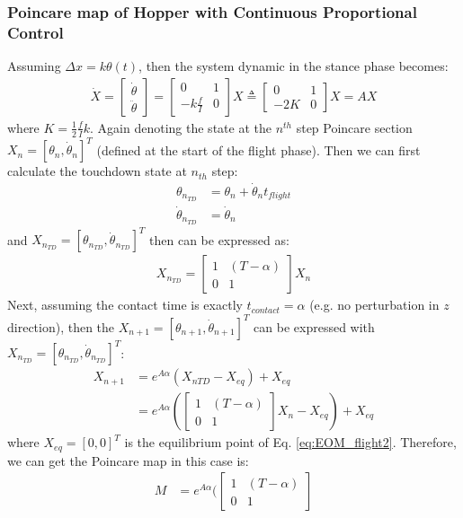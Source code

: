\subsubsection{Poincare map of Hopper with Continuous Proportional Control}

Assuming $\Delta x = k\theta(t)$, then the system dynamic in the stance phase becomes:
\begin{align}
\label{eq:EOM_flight2}
\dot X = 
\begin{bmatrix}
\dot \theta  \\
\ddot \theta
\end{bmatrix} = \begin{bmatrix}
0 & 1 \\
-k\frac{f}{I} & 0
\end{bmatrix}X \triangleq \begin{bmatrix}
0 & 1 \\
-2K & 0
\end{bmatrix}X = AX
\end{align}
\noindent where $K =\frac{1}{2} \frac{f}{I}k$. Again denoting the state at the $n^{th}$ step Poincare section $X_n = [\theta_n, \dot \theta_n]^T$ (defined at the start of the flight phase). Then we can first calculate the touchdown state at $n_{th}$ step:
\begin{align}
\nonumber\theta_{n_{TD}} &= \theta_{n} + \dot \theta_{n}t_{flight}\\
\nonumber\dot \theta_{n_{TD}} &= \dot \theta_{n}
\end{align}
and $X_{n_{TD}} = [\theta_{n_{TD}}, \dot \theta_{n_{TD}}]^T$ then can be expressed as:
\begin{align}
X_{n_{TD}} = \begin{bmatrix}
        1 & (T-\alpha) \\
        0 & 1
        \end{bmatrix}X_n
\end{align}
Next, assuming the contact time is exactly $t_{contact}= \alpha$ (e.g. no perturbation in $z$ direction), then the $X_{n+1} = [\theta_{n+1}, \dot \theta_{n+1}]^T$ can be expressed with $X_{n_{TD}} = [\theta_{n_{TD}}, \dot \theta_{n_{TD}}]^T$:
\begin{align}
X_{n+1} &= e^{A\alpha}(X_{n{TD}} - X_{eq}) +X_{eq} \\
        &= e^{A\alpha}(\begin{bmatrix}
        1 & (T-\alpha) \\
        0 & 1
        \end{bmatrix}X_n -X_{eq}) + X_{eq}
\end{align}
where $X_{eq} = [0,0]^T$ is the equilibrium point of Eq. \ref{eq:EOM_flight2}. Therefore, we can get the Poincare map in this case is:
\begin{align}
M &=   e^{A\alpha}(\begin{bmatrix}
        1 & (T-\alpha) \\
        0 & 1
        \end{bmatrix}
\end{align}

